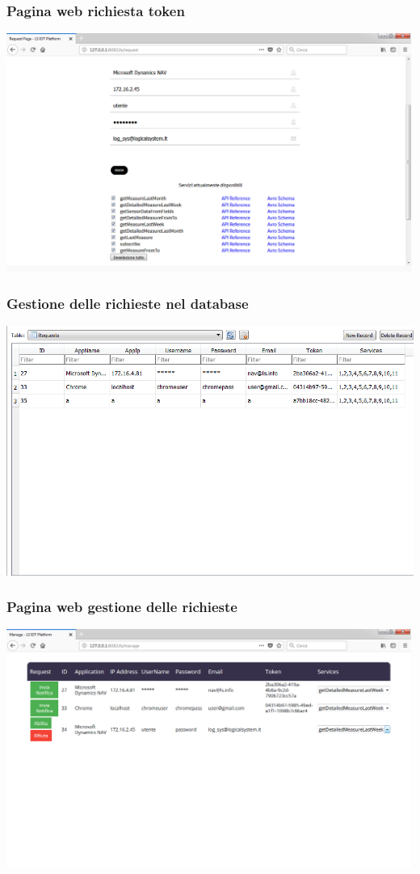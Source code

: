 \documentclass{beamer}
\begin{document}
\begin{frame}
\frametitle{Pagina web richiesta token}
\includegraphics[width=1\textwidth]{images/RequestPagePlatform.png}
\end{frame}

\begin{frame}
\frametitle{Gestione delle richieste nel database}
\includegraphics[width=1\textwidth]{images/DBPlatform2.png}
\end{frame}

\begin{frame}
\frametitle{Pagina web gestione delle richieste}
\includegraphics[width=1\textwidth]{images/managePagePlatform.png}
\end{frame}
\end{document}
